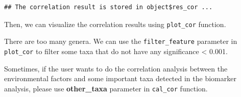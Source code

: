 \documentclass[
]{book}
\newenvironment{Shaded}{\begin{snugshade}}{\end{snugshade}}
\newcommand{\AttributeTok}[1]{\textcolor[rgb]{0.13,0.29,0.53}{#1}}
\newcommand{\CommentTok}[1]{\textcolor[rgb]{0.56,0.35,0.01}{\textit{#1}}}
\newcommand{\FunctionTok}[1]{\textcolor[rgb]{0.13,0.29,0.53}{\textbf{#1}}}
\newcommand{\NormalTok}[1]{#1}
\newcommand{\SpecialCharTok}[1]{\textcolor[rgb]{0.81,0.36,0.00}{\textbf{#1}}}
\newcommand{\StringTok}[1]{\textcolor[rgb]{0.31,0.60,0.02}{#1}}
\begin{document}
\begin{verbatim}
## The correlation result is stored in object$res_cor ...
\end{verbatim}

\begin{Shaded}
\end{Shaded}

Then, we can visualize the correlation results using \texttt{plot\_cor} function.

\begin{Shaded}
\end{Shaded}

There are too many genera.
We can use the \texttt{filter\_feature} parameter in \texttt{plot\_cor} to filter some taxa that do not have any significance \textless{} 0.001.

\begin{Shaded}
\end{Shaded}

Sometimes, if the user wants to do the correlation analysis between the environmental factors and some important taxa detected in the biomarker analysis,
please use \textbf{other\_taxa} parameter in \texttt{cal\_cor} function.
\end{document}
